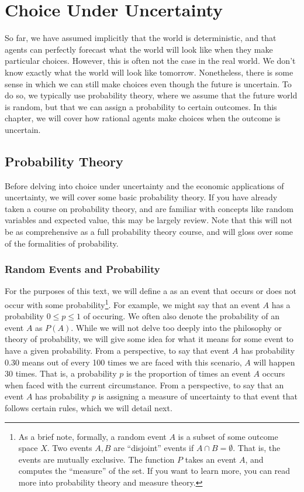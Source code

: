 \chapter{Choice Under Uncertainty}
So far, we have assumed implicitly that the world is deterministic, and that agents can perfectly forecast what the world will look like when they make particular choices. However, this is often not the case in the real world. We don't know exactly what the world will look like tomorrow. Nonetheless, there is some sense in which we can still make choices even though the future is uncertain. To do so, we typically use probability theory, where we assume that the future world is random, but that we can assign a probability to certain outcomes. In this chapter, we will cover how rational agents make choices when the outcome is uncertain. 

\section{Probability Theory}\label{sec:probability}
Before delving into choice under uncertainty and the economic applications of uncertainty, we will cover some basic probability theory. If you have already taken a course on probability theory, and are familiar with concepts like random variables and expected value, this may be largely review. Note that this will not be as comprehensive as a full probability theory course, and will gloss over some of the formalities of probability.

\subsection*{Random Events and Probability}
For the purposes of this text, we will define a  as an event that occurs or does not occur with some probability\footnote{
    As a brief note, formally, a random event $A$ is a subset of some outcome space $X$. Two events $A, B$ are ``disjoint'' events if $A \cap B = \emptyset$. That is, the events are mutually exclusive. The function $P$ takes an event $A$, and computes the ``measure'' of the set. If you want to learn more, you can read more into probability theory and measure theory. 
}. For example, we might say that an event $A$ has a probability $0 \leq p \leq 1$ of occuring. We often also denote the probability of an event $A$ as $P(A)$. While we will not delve too deeply into the philosophy or theory of probability, we will give some idea for what it means for some event to have a given probability. From a  perspective, to say that event $A$ has probability $0.30$ means out of every 100 times we are faced with this scenario, $A$ will happen 30 times. That is, a probability $p$ is the proportion of times an event $A$ occurs when faced with the current circumstance. From a  perspective, to say that an event $A$ has probability $p$ is assigning a measure of uncertainty to that event that follows certain rules, which we will detail next.

